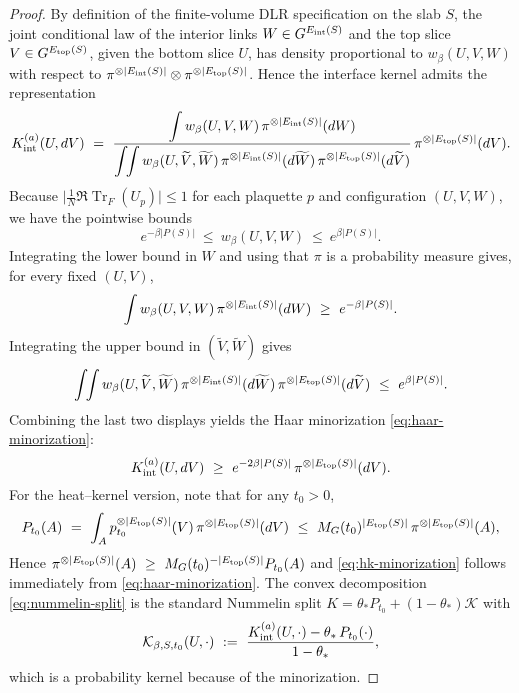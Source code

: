 \documentclass[11pt]{amsart}
\theoremstyle{plain}
\theoremstyle{definition}
\theoremstyle{remark}
\DeclareMathOperator{\Tr}{Tr}
\renewcommand{\tfrac}[2]{\textstyle\frac{#1}{#2}}
\begin{document}
\begin{proof}
By definition of the finite-volume DLR specification on the slab $S$, the joint conditional law of the interior links $W\in G^{E_{\rm int}(S)}$ and the top slice $V\in G^{E_{\rm top}(S)}$, given the bottom slice $U$, has density proportional to $w_\beta(U,V,W)$ with respect to $\pi^{\otimes |E_{\rm int}(S)|}\otimes \pi^{\otimes |E_{\rm top}(S)|}$. Hence the interface kernel admits the representation
\[
K_{\rm int}^{(a)}(U,dV)\ =\ \frac{\displaystyle \int w_\beta(U,V,W)\,\pi^{\otimes |E_{\rm int}(S)|}(dW)}{\displaystyle \int\!\!\int w_\beta(U,\widetilde V,\widetilde W)\,\pi^{\otimes |E_{\rm int}(S)|}(d\widetilde W)\,\pi^{\otimes |E_{\rm top}(S)|}(d\widetilde V)}\,\pi^{\otimes |E_{\rm top}(S)|}(dV).
\]
Because $\big|\tfrac{1}{N}\Re\Tr_F(U_p)\big|\le 1$ for each plaquette $p$ and configuration $(U,V,W)$, we have the pointwise bounds
\[
e^{-\beta |P(S)|}\ \le\ w_\beta(U,V,W)\ \le\ e^{\beta |P(S)|}.
\]
Integrating the lower bound in $W$ and using that $\pi$ is a probability measure gives, for every fixed $(U,V)$,
\[
\int w_\beta(U,V,W)\,\pi^{\otimes |E_{\rm int}(S)|}(dW)\ \ge\ e^{-\beta |P(S)|}.
\]
Integrating the upper bound in $(\widetilde V,\widetilde W)$ gives
\[
\int\!\!\int w_\beta(U,\widetilde V,\widetilde W)\,\pi^{\otimes |E_{\rm int}(S)|}(d\widetilde W)\,\pi^{\otimes |E_{\rm top}(S)|}(d\widetilde V)\ \le\ e^{\beta |P(S)|}.
\]
Combining the last two displays yields the Haar minorization \eqref{eq:haar-minorization}:
\[
K_{\rm int}^{(a)}(U,dV)\ \ge\ e^{-2\beta |P(S)|}\,\pi^{\otimes |E_{\rm top}(S)|}(dV).
\]
For the heat--kernel version, note that for any $t_0>0$,
\[
P_{t_0}(A)\ =\ \int_A p_{t_0}^{\otimes |E_{\rm top}(S)|}(V)\,\pi^{\otimes |E_{\rm top}(S)|}(dV)
\ \le\ M_G(t_0)^{|E_{\rm top}(S)|}\,\pi^{\otimes |E_{\rm top}(S)|}(A),
\]
Hence $\pi^{\otimes |E_{\rm top}(S)|}(A)\ \ge\ M_G(t_0)^{-|E_{\rm top}(S)|} P_{t_0}(A)$ and \eqref{eq:hk-minorization} follows immediately from \eqref{eq:haar-minorization}. The convex decomposition \eqref{eq:nummelin-split} is the standard Nummelin split $K=\theta_* P_{t_0}+(1-\theta_*)\mathcal{K}$ with
\[
\mathcal{K}_{\beta,S,t_0}(U,\cdot)\ :=\ \frac{K_{\rm int}^{(a)}(U,\cdot)-\theta_*\,P_{t_0}(\cdot)}{1-\theta_*},
\]
which is a probability kernel because of the minorization.
\end{proof}
\end{document}
